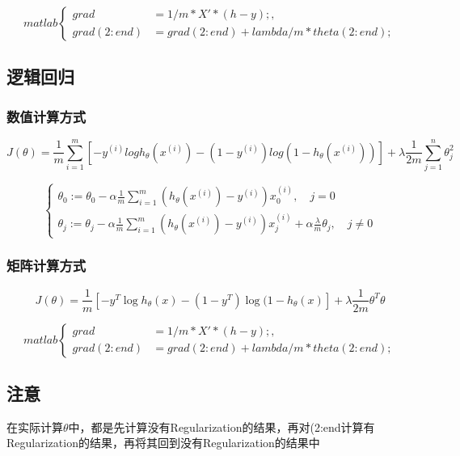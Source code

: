 
\[matlab\begin{cases}
	grad &= 1/m * X'*(h-y); , \quad\\
	grad(2:end) &= grad(2:end) + lambda/m * theta(2:end);
\end{cases}\]



\subsection{逻辑回归}

\subsubsection{数值计算方式}
\begin{equation}
	J(\theta) = \frac{1}{m}
	    \sum_{i=1}^m \left[ -y^{(i)}log{h_\theta(x^{(i)})} - (1-y^{(i)})log{(1-h_\theta(x^{(i)}))} \right]
		+ \lambda \frac{1}{2m} \sum_{j=1}^n\theta_j^2
\end{equation}

\[\begin{cases}
	\theta_0 := \theta_0 - \alpha \frac{1}{m} \sum_{i=1}^m(h_\theta(x^{(i)}) - y^{(i)})x_0^{(i)}, \quad j=0 \\
	\theta_j := \theta_j - \alpha \frac{1}{m} \sum_{i=1}^m(h_\theta(x^{(i)}) - y^{(i)})x_j^{(i)} + \alpha\frac{\lambda}{m}\theta_j, \quad j \neq 0
\end{cases}\]

\subsubsection{矩阵计算方式}
\begin{equation}
		J(\theta) = \frac{1}{m} [-y^T \log{h_\theta(x)} - (1-y^T) \log{(1-h_\theta(x)}] + \lambda \frac{1}{2m}\theta^T \theta
\end{equation}


\[matlab\begin{cases}
	grad &= 1/m * X'*(h-y); , \quad\\
	grad(2:end) &= grad(2:end) + lambda/m * theta(2:end);
\end{cases}\]



\subsection{注意}
在实际计算$\theta$中，都是先计算没有Regularization的结果，再对(2:end计算有Regularization的结果，再将其回到没有Regularization的结果中






